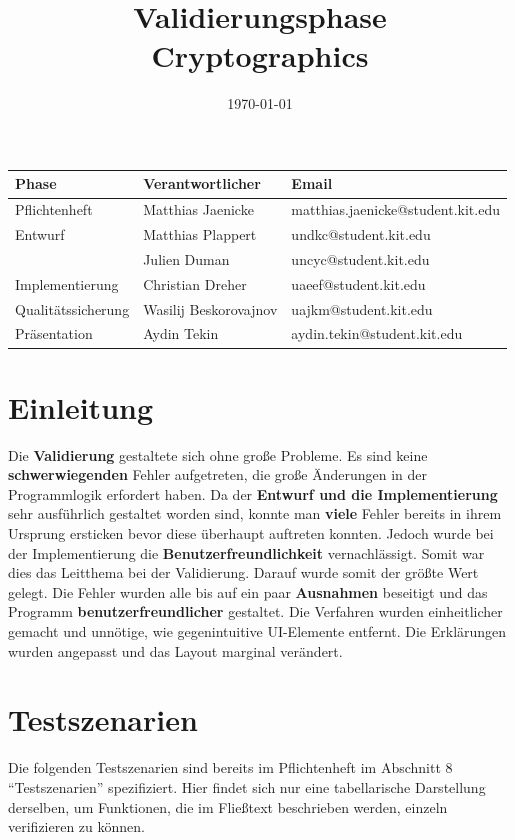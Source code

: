 \documentclass{article}
\title{\textbf{Validierungsphase} \\ Cryptographics}
\author{}
\date{\today}
\begin{document}
\maketitle
\begin{table}[b]
  \begin{tabular}{| l | l | l |}
    \hline
    \textbf{Phase} & \textbf{Verantwortlicher} & \textbf{Email} \\ \hline
    Pflichtenheft & Matthias Jaenicke & matthias.jaenicke@student.kit.edu \\ \hline
    Entwurf & Matthias Plappert & undkc@student.kit.edu \\
            & Julien Duman & uncyc@student.kit.edu \\ \hline
    Implementierung & Christian Dreher & uaeef@student.kit.edu \\ \hline
    Qualitätssicherung & Wasilij Beskorovajnov & uajkm@student.kit.edu \\ \hline
    Präsentation & Aydin Tekin & aydin.tekin@student.kit.edu \\ \hline
    \end{tabular}
\end{table}
\thispagestyle{empty}
\newpage

\tableofcontents
\newpage

\section{Einleitung}
	 Die \textbf{Validierung} gestaltete sich ohne große Probleme. Es sind keine \textbf{schwerwiegenden} Fehler aufgetreten, die große Änderungen in der Programmlogik 
	 erfordert haben. Da der \textbf{Entwurf und die Implementierung} sehr ausführlich gestaltet worden sind, konnte man \textbf{viele} Fehler bereits in ihrem Ursprung 
	 ersticken bevor diese überhaupt auftreten konnten. Jedoch wurde bei der Implementierung die \textbf{Benutzerfreundlichkeit} vernachlässigt. Somit war
	 dies das Leitthema bei der Validierung. Darauf wurde somit der größte Wert gelegt.\newline
	 Die Fehler wurden alle bis auf ein paar \textbf{Ausnahmen} beseitigt und das Programm \textbf{benutzerfreundlicher} gestaltet. Die Verfahren wurden einheitlicher
	 gemacht und unnötige, wie gegenintuitive UI-Elemente entfernt. Die Erklärungen wurden angepasst und das Layout marginal verändert.


\section{Testszenarien}
  Die folgenden Testszenarien sind bereits im Pflichtenheft im Abschnitt 8 ``Testszenarien'' spezifiziert. Hier
  findet sich nur eine tabellarische Darstellung derselben, um Funktionen, die im Fließtext beschrieben werden,
  einzeln verifizieren zu können.
  
\end{document}
